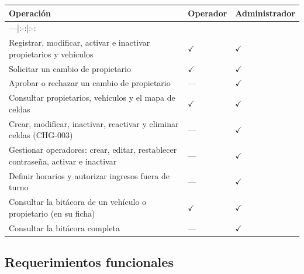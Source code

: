 \begin{longtable}{>{\raggedright\arraybackslash}p{10.2cm}>{\raggedright\arraybackslash}p{1.6cm}>{\raggedright\arraybackslash}p{2.6cm}}
\toprule
\textbf{Operación} & \textbf{Operador} & \textbf{Administrador}\\
\midrule\endhead
---|:-:|:-: &  & \\
Registrar, modificar, activar e inactivar propietarios y vehículos & $\checkmark$ & $\checkmark$\\
Solicitar un cambio de propietario & $\checkmark$ & $\checkmark$\\
Aprobar o rechazar un cambio de propietario & --- & $\checkmark$\\
Consultar propietarios, vehículos y el mapa de celdas & $\checkmark$ & $\checkmark$\\
Crear, modificar, inactivar, reactivar y eliminar celdas (CHG-003) & --- & $\checkmark$\\
Gestionar operadores: crear, editar, restablecer contraseña, activar e inactivar & --- & $\checkmark$\\
Definir horarios y autorizar ingresos fuera de turno & --- & $\checkmark$\\
Consultar la bitácora de un vehículo o propietario (en su ficha) & $\checkmark$ & $\checkmark$\\
Consultar la bitácora completa & --- & $\checkmark$\\
\bottomrule
\end{longtable}




\subsection{Requerimientos funcionales}

